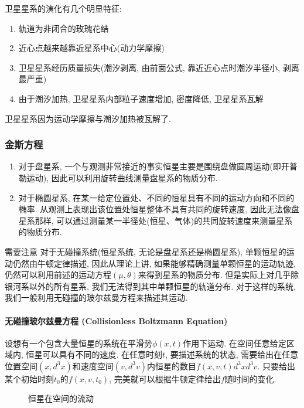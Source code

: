 卫星星系的演化有几个明显特征: 
\begin{enumerate}\small
    \item 轨道为非闭合的玫瑰花结
    \item 近心点越来越靠近星系中心(动力学摩擦)
    \item 卫星星系经历质量损失(潮汐剥离, 由前面公式, 靠近近心点时潮汐半径小, 剥离最严重)
    \item 由于潮汐加热, 卫星星系内部粒子速度增加, 密度降低, 卫星星系瓦解
\end{enumerate}
卫星星系因为运动学摩擦与潮汐加热被瓦解了. 

\subsubsection{金斯方程}
\begin{enumerate}\small
    \item 对于盘星系, 一个与观测非常接近的事实恒星主要是围绕盘做圆周运动(即开普勒运动), 因此可以利用旋转曲线测量盘星系的物质分布. 
    \item 对于椭圆星系, 在某一给定位置处、不同的恒星具有不同的运动方向和不同的椭率. 从观测上表现出该位置处恒星整体不具有共同的旋转速度, 因此无法像盘星系那样, 可以通过测量某一半径处(恒星、气体)的共同旋转速度来测量星系的物质分布. 
\end{enumerate}

需要注意 对于无碰撞系统(恒星系统, 无论是盘星系还是椭圆星系), 单颗恒星的运动仍然由牛顿定律描述, 因此从理论上讲, 如果能够精确测量单颗恒星的运动轨迹, 仍然可以利用前述的运动方程$(\mu, \theta)$来得到星系的物质分布. 但是实际上对几乎除银河系以外的所有星系, 我们无法得到其中单颗恒星的轨道分布.  对于这样的系统, 我们一般利用无碰撞的玻尔兹曼方程来描述其运动. 

\paragraph{无碰撞玻尔兹曼方程 (Collisionless Boltzmann Equation)}
设想有一个包含大量恒星的系统在平滑势$\phi(x, t)$作用下运动. 在空间任意给定区域内, 恒星可以具有不同的速度. 在任意时刻$t$, 要描述系统的状态, 需要给出在任意位置空间$(x, d^3 x)$和速度空间$(v, d^3 v)$内恒星的数目$f(x, v, t)d^3 xd^3v$. 只要给出某个初始时刻$t_0$的$f(x, v, t_0)$, 完美就可以根据牛顿定律给出$f$随时间的变化. 

\begin{figure}[!htb]
    \centering
    \caption{恒星在空间的流动}
\end{figure}

